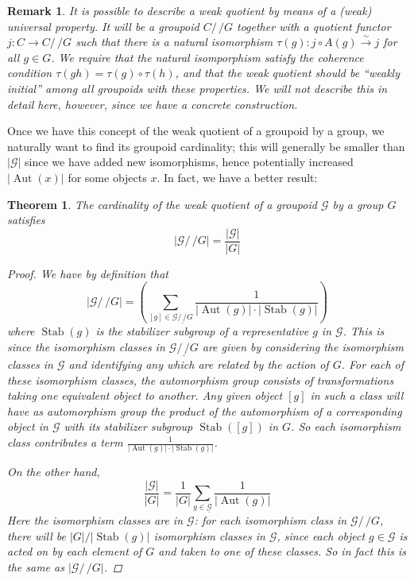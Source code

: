 \documentclass{amsart} \usepackage{amsmath,amssymb,bbm}
\newcommand{\opname}[1]{\operatorname{#1}}
\newtheorem{theorem}{Theorem}
\newcommand{\Longrightarrowlim}{\mathop{\longrightarrow}\limits}
\newtheorem{varremark}{Remark}
\newenvironment{remark}{\begin{varremark}\em}{\em\end{varremark}}
\begin{document}
\begin{remark}
It is possible to describe a weak quotient by means of a (weak)
universal property.  It will be a groupoid $C /\,\!\!/ G$ together
with a quotient functor $j : C \rightarrow C /\,\!\!/ G$ such that
there is a natural isomorphism $\tau ( g ) : j \circ A ( g )
\Longrightarrowlim^{\sim} j$ for all $g \in G$.  We require that the
natural isomporphism satisfy the coherence condition $\tau ( g h ) =
\tau ( g ) \circ \tau ( h )$, and that the weak quotient should be
``weakly initial'' among all groupoids with these properties.  We will
not describe this in detail here, however, since we have a concrete
construction.
\end{remark}

Once we have this concept of the weak quotient of a groupoid by a
group, we naturally want to find its groupoid cardinality; this will
generally be smaller than $|\mathcal{G}|$ since we have added new
isomorphisms, hence potentially increased $|\opname{Aut}(x)|$ for some
objects $x$.  In fact, we have a better result:

\begin{theorem} The cardinality of the weak quotient of a groupoid
$\mathcal{G}$ by a group $G$ satisfies
\begin{equation}
  |\mathcal{G}/\,\!\!/G| = \frac{|\mathcal{G}|}{|G|}
\end{equation}
\begin{proof}
We have by definition that
\begin{equation}
  |\mathcal{G}/\,\!\!/G| = \left( \sum_{[ g ] \in \underline{\mathcal{G}/\,\!\!/G}} \frac{1}{|\opname{Aut}(g)|\cdot|\opname{Stab}(g)|} \right)
\end{equation} where $\opname{Stab}(g)$ is the stabilizer subgroup of
a representative $g$ in $\mathcal{G}$.  This is since the isomorphism
classes in $\underline{\mathcal{G}/\,\!\!/G}$ are given by considering
the isomorphism classes in $\mathcal{G}$ and identifying any which are
related by the action of $G$.  For each of these isomorphism classes,
the automorphism group consists of transformations taking one
equivalent object to another.  Any given object $[g]$ in such a class
will have as automorphism group the product of the automorphism of a
corresponding object in $\mathcal{G}$ with its stabilizer subgroup
$\opname{Stab}([g])$ in $G$.  So each isomorphism class contributes a
term $\frac{1}{|\opname{Aut}(g)|\cdot|\opname{Stab}(g)|}$.

On the other hand,
\begin{equation}
 \frac{|\mathcal{G}|}{|G|} = \frac{1}{|G|} \sum_{g \in \underline{\mathcal{G}}} \frac{1}{|\opname{Aut}(g)|}
\end{equation} Here the isomorphism classes are in $\mathcal{G}$: for
each isomorphism class in $\mathcal{G}/\,\!\!/G$, there will be
$|G|/|\opname{Stab}(g)|$ isomorphism classes in $\mathcal{G}$, since each
object $g \in \mathcal{G}$ is acted on by each element of $G$ and
taken to one of these classes.  So in fact this is the same as
$|\mathcal{G}/\,\!\!/G|$.
\end{proof}
\end{theorem}
\end{document}
